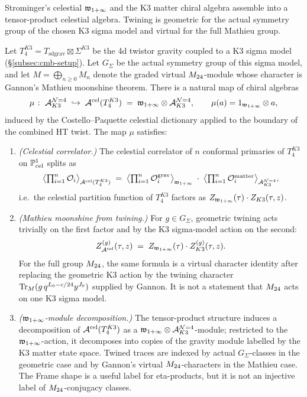 Strominger's celestial $\mathfrak w_{1+\infty}$ and the K3 matter chiral algebra assemble
into a tensor-product celestial algebra. Twining is geometric for the
actual symmetry group of the chosen K3 sigma model and virtual for the
full Mathieu group.

\begin{theorem}
\label{thm:celestial-moonshine-bridge}
Let $T_4^{K3} = T_{\mathrm{sd grav}} \boxtimes \Sigma^{K3}$ be the 4d
twistor gravity coupled to a K3 sigma model
(\S\ref{subsec:cmb-setup}). Let \(G_\Sigma\) be the actual symmetry group
of this sigma model, and let \(M=\bigoplus_{n\geq0}M_n\) denote the
graded virtual \(M_{24}\)-module whose character is Gannon's Mathieu
moonshine theorem. There is a natural map of chiral algebras
\begin{equation}
\label{eq:cmb-bridge-map}
\mu
\;\colon\;
\mathcal A^{\mathcal{N}{=}4}_{K3}
\;\hookrightarrow\;
\mathcal A^{\mathrm{cel}}(T_4^{K3})
\;=\;
\mathfrak w_{1+\infty} \otimes \mathcal A^{\mathcal{N}{=}4}_{K3},
\qquad
\mu(a) = 1_{\mathfrak w_{1+\infty}} \otimes a,
\end{equation}
induced by the Costello--Paquette celestial dictionary applied to the
boundary of the combined HT twist. The map $\mu$ satisfies:
\begin{enumerate}[label=\textup{(\roman*)}]
\item \emph{(Celestial correlator.)}
The celestial correlator of $n$ conformal primaries of $T_4^{K3}$ on
$\mathbb P^1_{\mathrm{cel}}$ splits as
\[
\bigl\langle \textstyle\prod_{i=1}^n \mathcal O_i
\bigr\rangle_{\mathcal A^{\mathrm{cel}}(T_4^{K3})}
\;=\;
\bigl\langle \textstyle\prod_{i=1}^n \mathcal O_i^{\mathrm{grav}}
\bigr\rangle_{\mathfrak w_{1+\infty}}
\;\cdot\;
\bigl\langle \textstyle\prod_{i=1}^n \mathcal O_i^{\mathrm{matter}}
\bigr\rangle_{\mathcal A^{\mathcal{N}{=}4}_{K3}},
\]
i.e.\ the celestial partition function of $T_4^{K3}$ factors as
$Z_{\mathfrak w_{1+\infty}}(\tau) \cdot Z_{K3}(\tau, z)$.
\item \emph{(Mathieu moonshine from twining.)}
For \(g\in G_\Sigma\), geometric twining acts trivially on the first
factor and by the K3 sigma-model action on the second:
\[
Z_{\mathcal A^{\mathrm{cel}}}^{(g)}(\tau, z)
\;=\;
Z_{\mathfrak w_{1+\infty}}(\tau) \cdot Z_{K3}^{(g)}(\tau, z).
\]
For the full group \(M_{24}\), the same formula is a virtual
character identity after replacing the geometric K3 action by the
twining character \(\operatorname{Tr}_M(g\,q^{L_0-c/24}y^{J_0})\) supplied by
Gannon. It is not a statement that \(M_{24}\) acts on one K3 sigma
model.
\item \emph{($\mathfrak w_{1+\infty}$-module decomposition.)}
The tensor-product structure induces a decomposition of
$\mathcal A^{\mathrm{cel}}(T_4^{K3})$ as a $\mathfrak w_{1+\infty} \otimes \mathcal A^{\mathcal{N}{=}4}_{K3}$-module;
restricted to the $\mathfrak w_{1+\infty}$-action, it decomposes into copies of the
gravity module labelled by the K3 matter state space. Twined traces are
indexed by actual \(G_\Sigma\)-classes in the geometric case and by
Gannon's virtual \(M_{24}\)-characters in the Mathieu case. The Frame
shape is a useful label for eta-products, but it is not an injective
label of \(M_{24}\)-conjugacy classes.
\end{enumerate}
\end{theorem}

